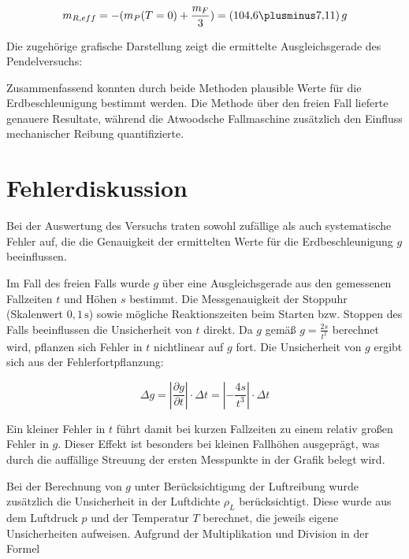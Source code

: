 \documentclass{protokoll}
\begin{document}
\begin{equation}
 m_{R,eff} = -(m_P(T=0) + \frac{m_F}{3}) = (104{,}6 \plusminus 7{,}11)\,g
\end{equation}

Die zugehörige grafische Darstellung zeigt die ermittelte Ausgleichsgerade des Pendelversuchs:


Zusammenfassend konnten durch beide Methoden plausible Werte für die Erdbeschleunigung bestimmt werden. Die Methode über den freien Fall lieferte genauere Resultate, während die Atwoodsche Fallmaschine zusätzlich den Einfluss mechanischer Reibung quantifizierte.




\section{Fehlerdiskussion}

Bei der Auswertung des Versuchs traten sowohl zufällige als auch systematische Fehler auf, die die Genauigkeit der ermittelten Werte für die Erdbeschleunigung $g$ beeinflussen.

Im Fall des freien Falls wurde $g$ über eine Ausgleichsgerade aus den gemessenen Fallzeiten $t$ und Höhen $s$ bestimmt. Die Messgenauigkeit der Stoppuhr (Skalenwert $0{,}1\,\text{s}$) sowie mögliche Reaktionszeiten beim Starten bzw. Stoppen des Falls beeinflussen die Unsicherheit von $t$ direkt. Da $g$ gemäß $g = \frac{2s}{t^2}$ berechnet wird, pflanzen sich Fehler in $t$ nichtlinear auf $g$ fort. Die Unsicherheit von $g$ ergibt sich aus der Fehlerfortpflanzung:

\begin{equation}
\Delta g = \left| \frac{\partial g}{\partial t} \right| \cdot \Delta t = \left| -\frac{4s}{t^3} \right| \cdot \Delta t
\end{equation}

Ein kleiner Fehler in $t$ führt damit bei kurzen Fallzeiten zu einem relativ großen Fehler in $g$. Dieser Effekt ist besonders bei kleinen Fallhöhen ausgeprägt, was durch die auffällige Streuung der ersten Messpunkte in der Grafik belegt wird.

Bei der Berechnung von $g$ unter Berücksichtigung der Luftreibung wurde zusätzlich die Unsicherheit in der Luftdichte $\rho_L$ berücksichtigt. Diese wurde aus dem Luftdruck $p$ und der Temperatur $T$ berechnet, die jeweils eigene Unsicherheiten aufweisen. Aufgrund der Multiplikation und Division in der Formel
\end{document}
